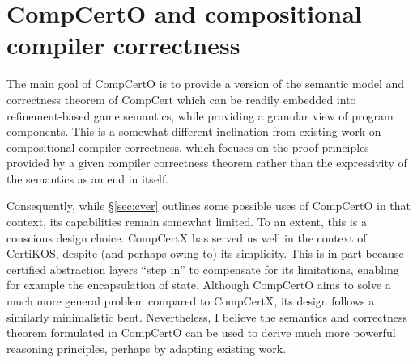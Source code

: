 \documentclass[11pt,oneside]{book}
\theoremstyle{definition}
\begin{document}

\section{CompCertO and compositional compiler correctness}

The main goal of CompCertO
is to provide a version of
the semantic model and correctness theorem of CompCert
which can be readily embedded into
refinement-based game semantics,
while providing a granular view of
program components.
This is a somewhat different inclination from
existing work on compositional compiler correctness,
which focuses on the proof principles provided by
a given compiler correctness theorem
rather than the expressivity of the semantics
as an end in itself.

Consequently,
while \S\ref{sec:cver}
outlines some possible uses of CompCertO in that context,
its capabilities remain somewhat limited.
To an extent, this is a conscious design choice.
CompCertX has served us well
in the context of CertiKOS,
despite (and perhaps owing to) its simplicity.
This is in part because certified abstraction layers
``step in'' to compensate for its limitations,
enabling for example the encapsulation of state.
Although CompCertO aims to solve
a much more general problem compared to CompCertX,
its design follows a similarly minimalistic bent.
Nevertheless,
I believe the semantics and correctness theorem
formulated in CompCertO
can be used to derive much more powerful
reasoning principles,
perhaps by adapting existing work.
\end{document}
